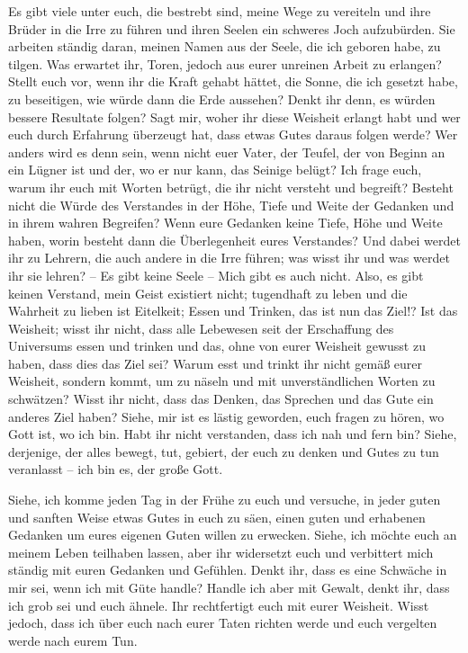        Es gibt viele unter euch, die bestrebt sind, meine Wege zu vereiteln und ihre Brüder in die Irre zu führen und ihren Seelen ein schweres Joch aufzubürden. Sie arbeiten ständig daran, meinen Namen aus der Seele, die ich geboren habe, zu tilgen. Was erwartet ihr, Toren, jedoch aus eurer unreinen Arbeit zu erlangen? Stellt euch vor, wenn ihr die Kraft gehabt hättet, die Sonne, die ich gesetzt habe, zu beseitigen, wie würde dann die Erde aussehen? Denkt ihr denn, es würden bessere Resultate folgen? Sagt mir, woher ihr diese Weisheit erlangt habt und wer euch durch Erfahrung überzeugt hat, dass etwas Gutes daraus folgen werde? Wer anders wird es denn sein, wenn nicht euer Vater, der Teufel, der von Beginn an ein Lügner ist und der, wo er nur kann, das Seinige belügt? Ich frage euch, warum ihr euch mit Worten betrügt, die ihr nicht versteht und begreift? Besteht nicht die Würde des Verstandes in der Höhe, Tiefe und Weite der Gedanken und in ihrem wahren Begreifen? Wenn eure Gedanken keine Tiefe, Höhe und Weite haben, worin besteht dann die Überlegenheit eures Verstandes? Und dabei werdet ihr zu Lehrern, die auch andere in die Irre führen; was wisst ihr und was werdet ihr sie lehren? -- Es gibt keine Seele -- Mich gibt es auch nicht. Also, es gibt keinen Verstand, mein Geist existiert nicht; tugendhaft zu leben und die Wahrheit zu lieben ist Eitelkeit; Essen und Trinken, das ist nun das Ziel!? Ist das Weisheit; wisst ihr nicht, dass alle Lebewesen seit der Erschaffung des Universums essen und trinken und das, ohne von eurer Weisheit gewusst zu haben, dass dies das Ziel sei? Warum esst und trinkt ihr nicht gemäß eurer Weisheit, sondern kommt, um zu näseln und mit unverständlichen Worten zu schwätzen? Wisst ihr nicht, dass das Denken, das Sprechen und das Gute ein anderes Ziel haben? Siehe, mir ist es lästig geworden, euch fragen zu hören, wo Gott ist, wo ich bin. Habt ihr nicht verstanden, dass ich nah und fern bin? Siehe, derjenige, der alles bewegt, tut, gebiert, der euch zu denken und Gutes zu tun veranlasst -- ich bin es, der große Gott. 
        
        Siehe, ich komme jeden Tag in der Frühe zu euch und versuche, in jeder guten und sanften Weise etwas Gutes in euch zu säen, einen guten und erhabenen Gedanken um eures eigenen Guten willen zu erwecken. Siehe, ich möchte euch an meinem Leben teilhaben lassen, aber ihr widersetzt euch und verbittert mich ständig mit euren Gedanken und Gefühlen. Denkt ihr, dass es eine Schwäche in mir sei, wenn ich mit Güte handle? Handle ich aber mit Gewalt, denkt ihr, dass ich grob sei und euch ähnele. Ihr rechtfertigt euch mit eurer Weisheit. Wisst jedoch, dass ich über euch nach eurer Taten richten werde und euch vergelten werde nach eurem Tun. 
        
